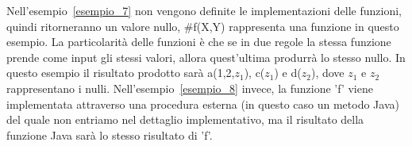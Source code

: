Nell'esempio~\ref{esempio_7} non vengono definite le implementazioni delle funzioni, quindi ritorneranno un valore nullo, \#f(X,Y) rappresenta una funzione in questo esempio. La particolarità delle funzioni è che se in due regole la stessa funzione prende come input gli stessi valori, allora quest'ultima produrrà lo stesso nullo. In questo esempio il risultato prodotto sarà a(1,2,$z_{1}$), c($z_{1}$) e d($z_{2}$), dove $z_{1}$ e $z_{2}$ rappresentano i nulli. 
Nell'esempio~\ref{esempio_8} invece, la funzione 'f' viene implementata attraverso una procedura esterna (in questo caso un metodo Java) del quale non entriamo nel dettaglio implementativo, ma il risultato della funzione Java sarà lo stesso risultato di 'f'.